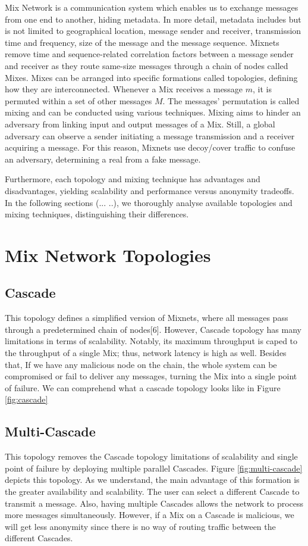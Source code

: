 \documentclass[logo,msc,cyber]{infthesis}   %
\begin{document}
Mix Network is a communication system which enables us to exchange messages from
one end to another, hiding metadata. In more detail, metadata includes but is
not limited to geographical location, message sender and receiver, transmission
time and frequency, size of the message and the message sequence. Mixnets remove
time and sequence-related correlation factors between a message sender and
receiver as they route same-size messages through a chain of nodes called Mixes.
Mixes can be arranged into specific formations called topologies, defining how
they are interconnected. Whenever a Mix receives a message $m$, it is permuted
within a set of other messages $M$. The messages' permutation is called mixing and
can be conducted using various techniques. Mixing aims to hinder an adversary
from linking input and output messages of a Mix. Still, a global adversary can
observe a sender initiating a message transmission and a receiver acquiring a
message. For this reason, Mixnets use decoy/cover traffic to confuse an
adversary, determining a real from a fake message. 

Furthermore, each topology and mixing technique has advantages and
disadvantages, yielding scalability and performance versus anonymity tradeoffs.
In the following sections (... ..), we thoroughly analyse available topologies
and mixing techniques, distinguishing their differences.


\section{Mix Network Topologies}

\subsection{Cascade}
This topology defines a simplified version of Mixnets, where all messages pass
through a predetermined chain of nodes[6]. However, Cascade topology has many
limitations in terms of scalability. Notably, its maximum throughput is caped to
the throughput of a single Mix; thus, network latency is high as well. Besides
that, If we have any malicious node on the chain, the whole system can be
compromised or fail to deliver any messages, turning the Mix into a single point
of failure. We can comprehend what a cascade topology looks like in Figure \ref{fig:cascade}

\subsection{Multi-Cascade}
This topology removes the Cascade topology limitations of scalability and
single point of failure by deploying multiple parallel Cascades. Figure \ref{fig:multi-cascade}
depicts this topology. As we understand, the main advantage of this formation is
the greater availability and scalability. The user can select a different
Cascade to transmit a message. Also, having multiple Cascades allows the network
to process more messages simultaneously. However, if a Mix on a Cascade is
malicious, we will get less anonymity since there is no way of routing traffic
between the different Cascades.
\end{document}
